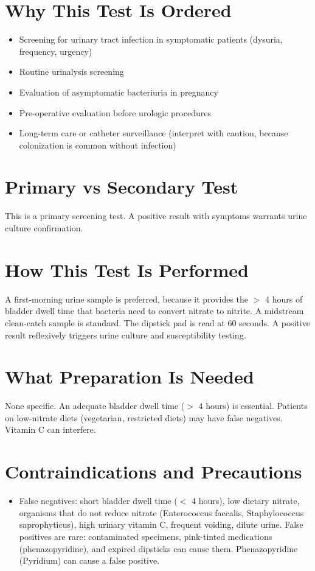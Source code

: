 \section*{Why This Test Is Ordered}
\begin{itemize}
  \item Screening for urinary tract infection in symptomatic patients (dysuria, frequency, urgency)
  \item Routine urinalysis screening
  \item Evaluation of asymptomatic bacteriuria in pregnancy \cite{nicolle2019clinical}
  \item Pre-operative evaluation before urologic procedures
  \item Long-term care or catheter surveillance (interpret with caution, because colonization is common without infection)
\end{itemize}

\section*{Primary vs Secondary Test}
This is a primary screening test. A positive result with symptoms warrants urine culture confirmation.

\section*{How This Test Is Performed}
A first-morning urine sample is preferred, because it provides the $>$ 4 hours of bladder dwell time that bacteria need to convert nitrate to nitrite. A midstream clean-catch sample is standard. The dipstick pad is read at 60 seconds. A positive result reflexively triggers urine culture and susceptibility testing.

\section*{What Preparation Is Needed}
None specific. An adequate bladder dwell time ($>$ 4 hours) is essential. Patients on low-nitrate diets (vegetarian, restricted diets) may have false negatives. Vitamin C can interfere.

\section*{Contraindications and Precautions}
\begin{itemize}
  \item False negatives: short bladder dwell time ($<$ 4 hours), low dietary nitrate, organisms that do not reduce nitrate (Enterococcus faecalis, Staphylococcus saprophyticus), high urinary vitamin C, frequent voiding, dilute urine. False positives are rare: contaminated specimens, pink-tinted medications (phenazopyridine), and expired dipsticks can cause them. Phenazopyridine (Pyridium) can cause a false positive.
\end{itemize}
